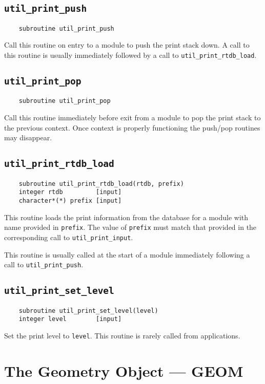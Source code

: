 \subsection{{\tt util\_print\_push}}
\begin{verbatim}
    subroutine util_print_push
\end{verbatim}
Call this routine on entry to a module to push the print stack down.
A call to this routine is usually immediately followed by a call to
\verb+util_print_rtdb_load+. 

\subsection{{\tt util\_print\_pop}}
\begin{verbatim}
    subroutine util_print_pop
\end{verbatim}
Call this routine immediately before exit from a module to pop the
print stack to the previous context.  Once context is properly
functioning the push/pop routines may disappear.

\subsection{{\tt util\_print\_rtdb\_load}}
\begin{verbatim}
    subroutine util_print_rtdb_load(rtdb, prefix)
    integer rtdb         [input]
    character*(*) prefix [input]
\end{verbatim}
This routine loads the print information from the database for a
module with name provided in \verb+prefix+.  The value of
\verb+prefix+ must match that provided in the corresponding call to
\verb+util_print_input+.

This routine is usually called at the start of a module immediately
following a call to \verb+util_print_push+.

\subsection{{\tt util\_print\_set\_level}}
\begin{verbatim}
    subroutine util_print_set_level(level)
    integer level        [input]
\end{verbatim}
Set the print level to {\tt level}.  This routine is rarely called
from applications.

\section{The Geometry Object --- GEOM}

